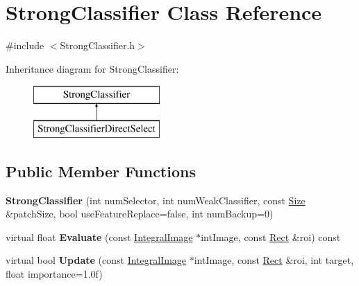 \hypertarget{classStrongClassifier}{}\section{Strong\+Classifier Class Reference}
\label{classStrongClassifier}


{\ttfamily \#include $<$Strong\+Classifier.\+h$>$}

Inheritance diagram for Strong\+Classifier\+:\begin{figure}[H]
\begin{center}
\leavevmode
\includegraphics[height=2.000000cm]{classStrongClassifier}
\end{center}
\end{figure}
\subsection*{Public Member Functions}
\begin{DoxyCompactItemize}
\item 
\hypertarget{classStrongClassifier_a98f65a1c2088937ce66f08dc710b178a}{}{\bfseries Strong\+Classifier} (int num\+Selector, int num\+Weak\+Classifier, const \hyperlink{classSize}{Size} \&patch\+Size, bool use\+Feature\+Replace=false, int num\+Backup=0)\label{classStrongClassifier_a98f65a1c2088937ce66f08dc710b178a}

\item 
\hypertarget{classStrongClassifier_a7f2079d46afe7a49cef73a1d8b5fc61d}{}virtual float {\bfseries Evaluate} (const \hyperlink{classIntegralImage}{Integral\+Image} $\ast$int\+Image, const \hyperlink{classRect}{Rect} \&roi) const \label{classStrongClassifier_a7f2079d46afe7a49cef73a1d8b5fc61d}

\item 
\hypertarget{classStrongClassifier_ac6515ad2049961798844049c3ba1e2d6}{}virtual bool {\bfseries Update} (const \hyperlink{classIntegralImage}{Integral\+Image} $\ast$int\+Image, const \hyperlink{classRect}{Rect} \&roi, int target, float importance=1.\+0f)\label{classStrongClassifier_ac6515ad2049961798844049c3ba1e2d6}

\end{DoxyCompactItemize}
